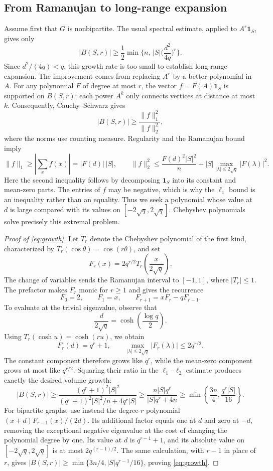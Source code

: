 \documentclass[11pt,reqno]{amsart}
\theoremstyle{definition}
\begin{document}
\subsection{From Ramanujan to long-range expansion}
Assume first that $G$ is nonbipartite. The usual spectral
estimate, applied to $A^r\mathbf1_S$, gives only
\[
 |B(S,r)|\ge
 \frac12\min\Big\{n,\,
 |S|\Big(\frac{d^2}{4q}\Big)^r\Big\}.
\]
Since $d^2/(4q)<q$, this growth rate is too small to establish
long-range expansion. The improvement comes from replacing $A^r$ by a better
polynomial in $A$. For any polynomial $F$ of degree at most
$r$, the vector $f=F(A)\mathbf1_S$ is supported on $B(S,r)$:
each power $A^k$ only connects vertices at distance at most $k$.
Consequently, Cauchy--Schwarz gives
\[
 |B(S,r)|\ge\frac{\|f\|_1^2}{\|f\|_2^2},
\]
where the norms use counting measure. Regularity and the
Ramanujan bound imply
\[
 \|f\|_1\ge\left|\sum_x f(x)\right|=|F(d)|\,|S|,
 \qquad
 \|f\|_2^2\le
 \frac{F(d)^2|S|^2}{n}
 +|S|\max_{|\lambda|\le2\sqrt q}|F(\lambda)|^2.
\]
Here the second inequality follows by decomposing
$\mathbf1_S$ into its constant and mean-zero parts.
The entries of $f$ may be negative, which is why the
$\ell_1$ bound is an inequality rather than an equality.
Thus we seek a polynomial whose value at $d$ is large
compared with its values on $[-2\sqrt q,2\sqrt q]$. Chebyshev polynomials solve precisely this extremal problem.

\begin{proof}[Proof of \eqref{eq:growth}]
Let $T_r$ denote the Chebyshev polynomial of the first kind,
characterized by $T_r(\cos\theta)=\cos(r\theta)$, and set
\[
 F_r(x)=2q^{r/2}T_r\left(\frac{x}{2\sqrt q}\right).
\]
The change of variables sends the Ramanujan interval to
$[-1,1]$, where $|T_r|\le1$. The prefactor makes $F_r$ monic
for $r\ge1$ and gives the recurrence
\[
 F_0=2,\qquad F_1=x,\qquad
 F_{r+1}=xF_r-qF_{r-1}.
\]
To evaluate at the trivial eigenvalue, observe that
\[
 \frac{d}{2\sqrt q}
 =\cosh\left(\frac{\log q}{2}\right).
\]
Using $T_r(\cosh u)=\cosh(ru)$, we obtain
\[
 F_r(d)=q^r+1,
 \qquad
 \max_{|\lambda|\le2\sqrt q}|F_r(\lambda)|
 \le2q^{r/2}.
\]
The constant component therefore grows like $q^r$, while
the mean-zero component grows at most like $q^{r/2}$.
Squaring their ratio in the $\ell_1$--$\ell_2$ estimate
produces exactly the desired volume growth:
\[
 |B(S,r)|
 \ge
 \frac{(q^r+1)^2|S|^2}
 {(q^r+1)^2|S|^2/n+4q^r|S|}
 \ge
 \frac{n|S|q^r}{|S|q^r+4n} \ge \min\left\{\frac{3n}{4},\frac{q^r|S|}{16}\right\}.
\]
For bipartite graphs, use instead the degree-$r$ polynomial
$(x+d)F_{r-1}(x)/(2d)$. Its additional factor equals one
at $d$ and zero at $-d$, removing the exceptional negative
eigenvalue at the cost of changing the polynomial degree by one. Its value at $d$ is $q^{r-1}+1$, and its absolute value on
$[-2\sqrt q,2\sqrt q]$ is at most $2q^{(r-1)/2}$.
The same calculation, with $r-1$ in place of $r$, gives
$|B(S,r)|\ge\min\{3n/4,|S|q^{r-1}/16\}$, proving
\eqref{eq:growth}.
\end{proof}
\end{document}
